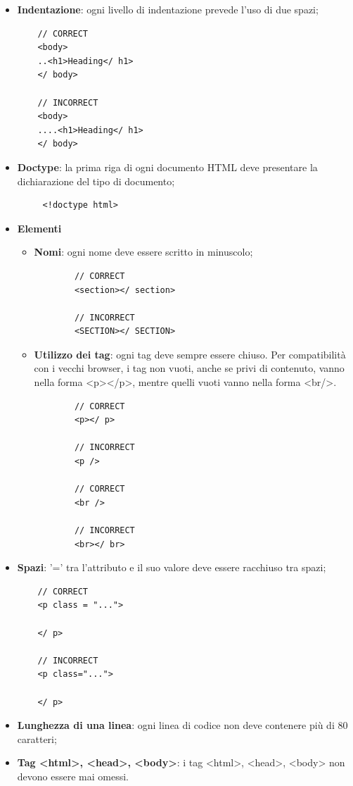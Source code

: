 \begin{itemize}
	\item{\textbf{Indentazione}: ogni livello di indentazione prevede l'uso di due spazi;}
	\begin{lstlisting}
	// CORRECT
	<body>
	..<h1>Heading</ h1>
	</ body> 
	
	// INCORRECT
	<body>
	....<h1>Heading</ h1>
	</ body> 
	\end{lstlisting}
	\item{\textbf{Doctype}: la prima riga di ogni documento HTML deve presentare la dichiarazione del tipo di documento;}
	 \begin{lstlisting}
	 <!doctype html> 
	 \end{lstlisting}
	 \item{\textbf{Elementi}}
	 \begin{itemize}
	 	\item{\textbf{Nomi}: ogni nome deve essere scritto in minuscolo;}
	 	\begin{lstlisting}
	 	// CORRECT
	 	<section></ section> 
	 	
	 	// INCORRECT
	 	<SECTION></ SECTION> 
	 	\end{lstlisting}
	 	\item{\textbf{Utilizzo dei tag}: ogni tag deve sempre essere chiuso. Per compatibilità con i vecchi browser, i tag non vuoti, anche se privi di contenuto, vanno nella forma <p></p>, mentre quelli vuoti vanno nella forma <br/>. 	
	 	}
 		\begin{lstlisting}
 		// CORRECT
 		<p></ p>
 		
 		// INCORRECT
 		<p />  
 		
 		// CORRECT
 		<br />
 		
 		// INCORRECT
 		<br></ br>   
 		\end{lstlisting} 
	 \end{itemize}
 	\item{\textbf{Spazi}: '=' tra l'attributo e il suo valore deve essere racchiuso tra spazi;}
 	\begin{lstlisting}
 	// CORRECT
 	<p class = "...">
 
 	</ p>
 	
 	// INCORRECT
 	<p class="...">  
 	  
 	</ p>
 	\end{lstlisting} 
 	\item{\textbf{Lunghezza di una linea}: ogni linea di codice non deve contenere più di 80 caratteri;
 	}
 	\item{\textbf{Tag <html>, <head>, <body>}: i tag <html>, <head>, <body> non devono essere mai omessi.}
\end{itemize}

